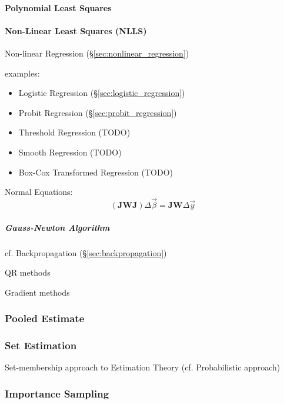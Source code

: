 \paragraph{Polynomial Least Squares}\label{sec:polynomial_least_squares}\hfill

\paragraph{Non-Linear Least Squares (NLLS)}\label{sec:nlls}\hfill

Non-linear Regression (\S\ref{sec:nonlinear_regression})

examples:
\begin{itemize}
  \item Logistic Regression (\S\ref{sec:logistic_regression})
  \item Probit Regression (\S\ref{sec:probit_regression})
  \item Threshold Regression (TODO)
  \item Smooth Regression (TODO)
  \item Box-Cox Transformed Regression (TODO)
\end{itemize}

Normal Equations:
\[
  (\mathbf{J} \mathbf{W J}) \Delta \vec{\beta} =
    \mathbf{J} \mathbf{W} \Delta \vec{y}
\]



\subparagraph{Gauss-Newton Algorithm}\label{sec:gauss_newton}\hfill

cf. Backpropagation (\S\ref{sec:backpropagation})

QR methods

Gradient methods



\subsubsection{Pooled Estimate}\label{sec:pooled_estimate}




\subsubsection{Set Estimation}\label{sec:set_estimation}

Set-membership approach to Estimation Theory (cf. Probabilistic approach)



\subsubsection{Importance Sampling}\label{sec:importance_sampling}


